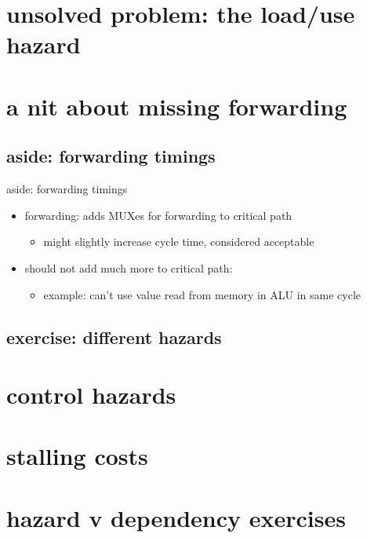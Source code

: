 \section{unsolved problem: the load/use hazard}


\section{a nit about missing forwarding}


\subsection{aside: forwarding timings}
\begin{frame}{aside: forwarding timings}
    \begin{itemize}
    \item forwarding: adds MUXes for forwarding to critical path
        \begin{itemize}
        \item might slightly increase cycle time, considered acceptable
        \end{itemize}
    \item should not add much more to critical path:
        \begin{itemize}
        \item example: can't use value read from memory in ALU in same cycle
        \end{itemize}
    \end{itemize}
\end{frame}

\subsection{exercise: different hazards}


\section{control hazards}


\section{stalling costs}


\section{hazard v dependency exercises}
